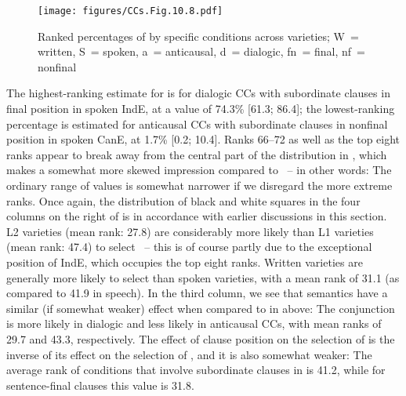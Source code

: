 \begin{figure}
\texttt{[image: figures/CCs.Fig.10.8.pdf]}
\caption{\label{bkm:Ref60241527}\label{fig:10.8}Ranked percentages of  by specific conditions across varieties; W~= written, S~= spoken,  a~= anticausal, d~= dialogic, fn~= final, nf~= nonfinal}
\end{figure}

The highest-ranking estimate for  is for dialogic CCs with subordinate clauses in final position in spoken IndE, at a value of 74.3\% [61.3; 86.4]; the lowest-ranking percentage is estimated for anticausal CCs with subordinate clauses in nonfinal position in spoken CanE, at 1.7\% [0.2; 10.4]. Ranks 66–72 as well as the top eight ranks appear to break away from the central part of the distribution in  , which makes a somewhat more skewed impression compared to ~– in other words: The ordinary range of values is somewhat narrower if we disregard the more extreme ranks. Once again, the distribution of black and white squares in the four columns on the right of  is in accordance with earlier discussions in this section. L2 varieties (mean rank: 27.8) are considerably more likely than L1 varieties (mean rank: 47.4) to select ~– this is of course partly due to the exceptional position of IndE, which occupies the top eight ranks. Written varieties are generally more likely to select  than spoken varieties, with a mean rank of 31.1 (as compared to 41.9 in speech). In the third column, we see that semantics have a similar (if somewhat weaker) effect when compared to  in  above: The conjunction  is more likely in dialogic and less likely in anticausal CCs, with mean ranks of 29.7 and 43.3, respectively. The effect of clause position on the selection of  is the inverse of its effect on the selection of , and it is also somewhat weaker: The average rank of conditions that involve subordinate clauses in  is 41.2, while for sentence-final clauses this value is 31.8.

